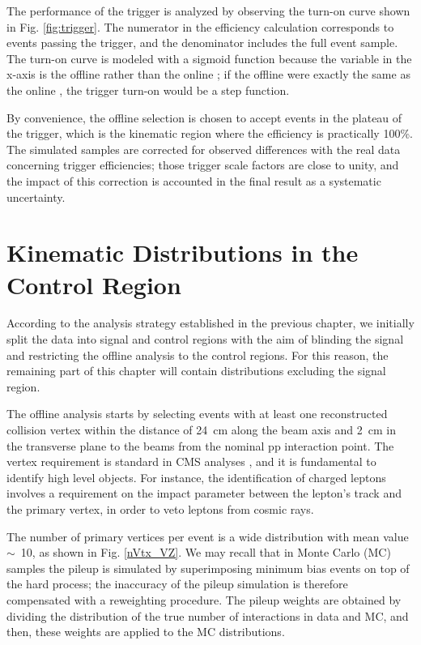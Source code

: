 The performance of the trigger is analyzed by observing the turn-on curve shown in Fig. \ref{fig:trigger}. The numerator in the efficiency calculation corresponds to events passing the trigger, and the denominator includes the full event sample. The turn-on curve is modeled with a sigmoid function because the variable in the x-axis is the offline \ptrans rather than the online \ptrans; if the offline \ptrans were exactly the same as the online \ptrans, the trigger turn-on would be a step function. 

By convenience, the offline selection is chosen to accept events in the plateau of the trigger, which is the kinematic region where the efficiency is practically 100\%. The simulated samples are corrected for observed differences with the real data concerning trigger efficiencies; those trigger scale factors are close to unity, and the impact of this correction is accounted in the final result as a systematic uncertainty.

\section{Kinematic Distributions in the Control Region}
According to the analysis strategy established in the previous chapter,  we initially split the data into signal and control regions with the aim of blinding the signal and restricting the offline analysis to the control regions. For this reason, the remaining part of this chapter will contain distributions excluding the signal region.  

The offline analysis starts by selecting events with at least one reconstructed collision vertex within the distance of 24~cm along the beam axis and 2~cm in the transverse plane to the beams from the nominal pp interaction point. The vertex requirement is standard in CMS analyses \cite{Chatrchyan:2014fea}, and it is fundamental to identify high level objects. For instance, the identification of charged leptons involves a requirement on the impact parameter between the lepton's track and the primary vertex, in order to veto leptons from cosmic rays.

The number of primary vertices per event is a wide distribution with mean value $\sim$~10, as shown in Fig. \ref{nVtx_VZ}. We may recall that in Monte Carlo (MC) samples the pileup is simulated by superimposing minimum bias events on top of the hard process; the inaccuracy of the pileup simulation is therefore compensated with a reweighting procedure. The pileup weights are obtained by dividing the distribution of the true number of interactions in data and MC, and then, these weights are applied to the MC distributions.

